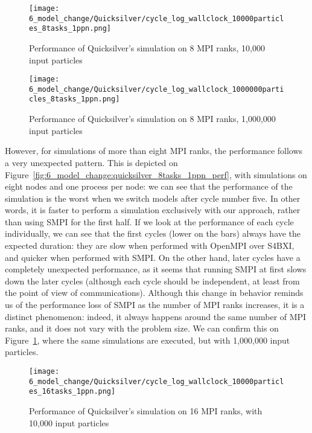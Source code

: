 \begin{figure}[!p]
    \centering\vspace{-3ex}
    \texttt{[image: 6\_model\_change/Quicksilver/cycle\_log\_wallclock\_10000particles\_8tasks\_1ppn.png]}
    \caption{Performance of Quicksilver's simulation on 8 MPI ranks,  10,000 input particles}
    \label{fig:6_model_change:quicksilver_8tasks_1ppn_perf}

    \centering
    \texttt{[image: 6\_model\_change/Quicksilver/cycle\_log\_wallclock\_1000000particles\_8tasks\_1ppn.png]}
    \caption{Performance of Quicksilver's simulation on 8 MPI ranks,  1,000,000 input particles}
    \label{fig:6_model_change:quicksilver_8tasks_1ppn_perf_big}
\end{figure}

However, for simulations of more than eight MPI ranks, the performance follows a
very unexpected pattern. This is depicted on
Figure~\ref{fig:6_model_change:quicksilver_8tasks_1ppn_perf}, with simulations
on eight nodes and one process per node: we can see that the performance of the
simulation is the worst when we switch models after cycle number five. In other
words, it is faster to perform a simulation exclusively with our approach,
rather than using SMPI for the first half. If we look at the performance of each
cycle individually, we can see that the first cycles (lower on the bars) always
have the expected duration: they are slow when performed with OpenMPI over
S4BXI, and quicker when performed with SMPI. On the other hand, later cycles
have a completely unexpected performance, as it seems that running SMPI at first
slows down the later cycles (although each cycle should be independent, at least
from the point of view of communications). Although this change in behavior
reminds us of the performance loss of SMPI as the number of MPI ranks increases,
it is a distinct phenomenon: indeed, it always happens around the same number of
MPI ranks, and it does not vary with the problem size. We can confirm this on
Figure~\ref{fig:6_model_change:quicksilver_8tasks_1ppn_perf_big}, where the same
simulations are executed, but with 1,000,000 input particles.

\begin{figure}[!ht]
    \centering
    \texttt{[image: 6\_model\_change/Quicksilver/cycle\_log\_wallclock\_10000particles\_16tasks\_1ppn.png]}
    \caption{Performance of Quicksilver's simulation on 16 MPI ranks, with 10,000 input particles}
    \label{fig:6_model_change:quicksilver_16tasks_1ppn_perf}
\end{figure}

